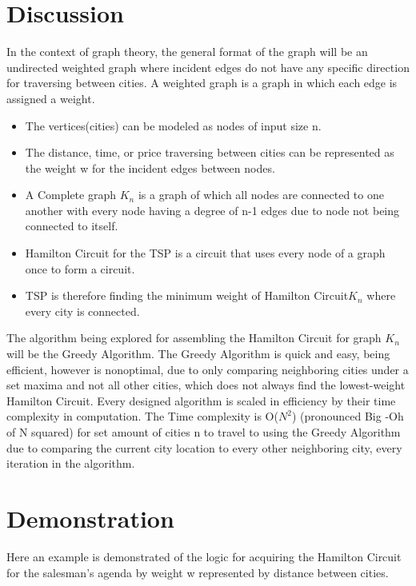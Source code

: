 \documentclass[a4paper,11pt]{scrartcl}
\begin{document}
\section{Discussion} 

In the context of graph theory, the general format of the graph will be an undirected weighted graph where incident edges do not have any specific direction for traversing between cities. A weighted graph is a graph in which each edge is assigned a weight.

\begin{itemize}
  \item The vertices(cities) can be modeled as nodes of input size n.
  \item The distance, time, or price traversing between cities can be represented as the weight w for the incident edges between nodes.
  \item A Complete graph $K_n$ is a graph of which all nodes are connected to one another with every node having a degree of n-1 edges due to node not being connected to itself.
  \item Hamilton Circuit for the TSP is a circuit that uses every node of a graph once to form a circuit.
  \item TSP is therefore finding the minimum weight of Hamilton Circuit$K_n$ where every city is connected.
\end{itemize}

The algorithm being explored for assembling the Hamilton Circuit for graph $K_n$ will be the Greedy Algorithm. The Greedy Algorithm is quick and easy, being efficient, however is nonoptimal, due to only comparing neighboring cities under a set maxima and not all other cities, which does not always find the lowest-weight Hamilton Circuit. 
Every designed algorithm is scaled in efficiency by their time complexity in computation. The Time complexity is O($N^2$) (pronounced Big -Oh of N squared) for set amount of cities n to travel to using the Greedy Algorithm due to comparing the current city location to every other neighboring city, every iteration in the algorithm.

\section{Demonstration}

Here an example is demonstrated of the logic for acquiring the Hamilton Circuit for the salesman’s agenda by weight w represented by distance between cities.
\end{document}
